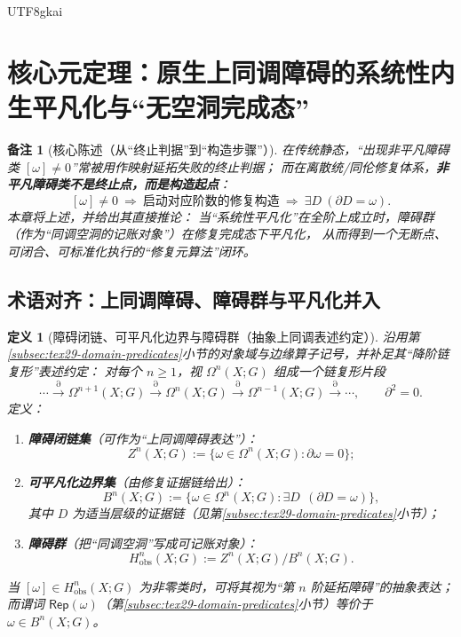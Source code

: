 \documentclass[12pt]{article}
\newtheorem{definition}{定义}[section]
\newtheorem{remark}{备注}[section]
\newcommand{\KouJing}{\texorpdfstring{表述约定}{表述约定}}
\begin{document}
\begin{CJK*}{UTF8}{gkai}
\clearpage

\section{核心元定理：原生上同调障碍的系统性内生平凡化与“无空洞完成态”}
\label{sec:tex29-ch7}

\begin{remark}[核心陈述（从“终止判据”到“构造步骤”）]
在传统静态，“出现非平凡障碍类 $[\omega]\neq 0$”常被用作映射延拓失败的终止判据；
而在离散统/同伦修复体系，\textbf{非平凡障碍类不是终止点，而是构造起点}：
\[
  [\omega]\neq 0\ \Longrightarrow\ \text{启动对应阶数的修复构造}\ \Longrightarrow\ \exists D\ (\partial D=\omega).
\]
本章将上述，并给出其直接推论：
当“系统性平凡化”在全阶上成立时，障碍群（作为“同调空洞的记账对象”）在修复完成态下平凡化，
从而得到一个无断点、可闭合、可标准化执行的“修复元算法”闭环。
\end{remark}

\subsection{术语对齐：上同调障碍、障碍群与平凡化并入}
\label{subsec:tex29-core-meta-terminology}

\begin{definition}[障碍闭链、可平凡化边界与障碍群（抽象上同调\KouJing）]
沿用第\ref{subsec:tex29-domain-predicates}小节的对象域与边缘算子记号，并补足其“降阶链复形”\KouJing：
对每个 $n\ge 1$，视 $\Omega^n(X;G)$ 组成一个链复形片段
\[
  \cdots \xrightarrow{\partial} \Omega^{n+1}(X;G)\xrightarrow{\partial}\Omega^{n}(X;G)\xrightarrow{\partial}\Omega^{n-1}
    (X;G)\xrightarrow{\partial}\cdots,
  \qquad \partial^2=0.
\]
定义：
\begin{enumerate}
  \item \textbf{障碍闭链集}（可作为“上同调障碍表达”）：
  \[
    Z^n(X;G):=\{\omega\in\Omega^n(X;G):\partial\omega=0\};
  \]
  \item \textbf{可平凡化边界集}（由修复证据链给出）：
  \[
    B^n(X;G):=\{\omega\in\Omega^n(X;G):\exists D\ \ (\partial D=\omega)\},
  \]
  其中 $D$ 为适当层级的证据链（见第\ref{subsec:tex29-domain-predicates}小节）；
  \item \textbf{障碍群}（把“同调空洞”写成可记账对象）：
  \[
    H^n_{\mathrm{obs}}(X;G):=Z^n(X;G)\big/ B^n(X;G).
  \]
\end{enumerate}
当 $[\omega]\in H^n_{\mathrm{obs}}(X;G)$ 为非零类时，可将其视为“第 $n$ 阶延拓障碍”的抽象表达；
而谓词 $\mathsf{Rep}(\omega)$（第\ref{subsec:tex29-domain-predicates}小节）等价于 $\omega\in B^n(X;G)$。
\end{definition}


\end{CJK*}
\end{document}

